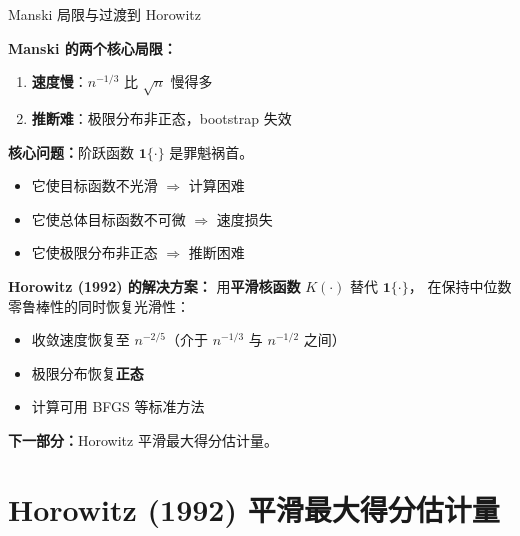 \documentclass[aspectratio=169, 10pt]{beamer}
\begin{document}
\begin{frame}{Manski 局限与过渡到 Horowitz}

  \textbf{Manski 的两个核心局限：}
  \begin{enumerate}\setlength{\itemsep}{1pt}
    \item \textbf{速度慢}：$n^{-1/3}$ 比 $\sqrt{n}$ 慢得多
    \item \textbf{推断难}：极限分布非正态，bootstrap 失效
  \end{enumerate}

  \begin{keybox}
    \textbf{核心问题：}阶跃函数 $\mathbf{1}\{\cdot\}$ 是罪魁祸首。
    \begin{itemize}\setlength{\itemsep}{1pt}
      \item 它使目标函数不光滑 $\Rightarrow$ 计算困难
      \item 它使总体目标函数不可微 $\Rightarrow$ 速度损失
      \item 它使极限分布非正态 $\Rightarrow$ 推断困难
    \end{itemize}
  \end{keybox}

  \begin{highlightbox}
    \textbf{Horowitz (1992) 的解决方案：}
    用\textbf{平滑核函数} $K(\cdot)$ 替代 $\mathbf{1}\{\cdot\}$，
    在保持中位数零鲁棒性的同时恢复光滑性：
    \begin{itemize}\setlength{\itemsep}{1pt}
      \item 收敛速度恢复至 $n^{-2/5}$（介于 $n^{-1/3}$ 与 $n^{-1/2}$ 之间）
      \item 极限分布恢复\textbf{正态}
      \item 计算可用 BFGS 等标准方法
    \end{itemize}
  \end{highlightbox}

  \textbf{下一部分：}Horowitz 平滑最大得分估计量。

\end{frame}

\section{Horowitz (1992) 平滑最大得分估计量}
\end{document}
